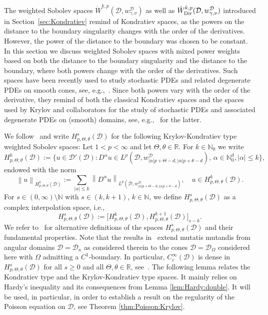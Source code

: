 \documentclass[12pt,a4paper, reqno]{amsart}
\theoremstyle{plain}
\theoremstyle{definition}
\theoremstyle{remark}
\numberwithin{equation}{section}
\newcommand{\1}{\mathbbm{1}}
\newcommand{\R}{\ensuremath{\mathbb{R}}}
\newcommand{\N}{\ensuremath{\mathbb{N}}}
\newcommand{\calD}{\ensuremath{\mathcal{D}}}
\newcommand{\scrD}{\ensuremath{\mathscr{D}}}
\newcommand{\Dir}{\textup{Dir}}
\newcommand{\nrm}[1]{\left\lVert #1 \right\rVert}
\begin{document}
The weighted Sobolev spaces $\Dot{W}^{k,p}(\calD,w_{\gamma,\nu}^\calD)$ as well as $\Dot{W}^{k,p}_\Dir(\calD,w_{\gamma,\nu}^\calD)$ introduced in Section~\ref{sec:Kondratiev} remind of Kondratiev spaces, as the powers on the distance to the boundary singularity changes with the order of the derivatives. 
However, the power of the distance to the boundary was chosen to be constant.
In this section we discuss weighted Sobolev spaces with mixed power weights based on both the distance to the boundary singularity and the distance to the boundary, where both powers change with the order of the derivatives. 
Such spaces have been recently used to study stochastic PDEs and related degenerate PDEs on smooth cones, see, e.g.,~\cite{cioicalicht2024sobolevspacesmixedweights,CioKimLee2019, KimLeeSeo2022b, KimLeeSeo2021,Cio20}.
Since both powers vary with the order of the derivative, they remind of both the classical Kondratiev spaces and the spaces used by Krylov and collaborators for the study of stochastic PDEs and associated degenerate PDEs on (smooth) domains, see, e.g.,~\cite{Krylov1999c,Lot2000,Kim2004} for the latter. 


We follow~\cite{cioicalicht2024sobolevspacesmixedweights} and write $H^s_{p,\Theta,\theta}(\calD)$ for the following Krylov-Kondratiev type weighted Sobolev spaces: 
Let $1<p<\infty$ and let $\Theta,\theta\in\R$. For $k\in\N_0$ we write
\[
H^k_{p,\Theta,\theta}(\calD)
:=
\big\{
u\in\scrD'(\calD)\colon D^\alpha u \in L^p(\calD,w^\calD_{\lvert\alpha\rvert p+\Theta-d,\lvert\alpha\rvert p+\theta-d}),\,\alpha \in\N_0^d,\lvert\alpha\rvert\leq k
\big\},
\]
endowed with the norm
\[
\nrm{u}_{H^k_{p,\Theta,\theta}(\calD)}
:=
\sum_{\lvert\alpha\rvert\leq k}
\nrm{D^\alpha u}_{L^p(\calD,w^\calD_{\lvert\alpha\rvert p+\Theta-d,\lvert\alpha\rvert p+\theta-d})},
\quad 
u\in H^k_{p,\Theta,\theta}(\calD).
\]
For $s\in (0,\infty)\setminus \N$ with $s\in (k,k+1)$, $k\in\N$, we define $H^s_{p,\Theta,\theta}(\calD)$ as a complex interpolation space, i.e., 
\[
H^s_{p,\Theta,\theta}(\calD)
:=
\big[H^k_{p,\Theta,\theta}(\calD),H^{k+1}_{p,\Theta,\theta}(\calD) \big]_{s-k}.
\]
We refer to~\cite[Section~3]{cioicalicht2024sobolevspacesmixedweights} for alternative definitions of the spaces $H^s_{p,\Theta,\theta}(\calD)$ and their fundamental properties. 
Note that the results in~\cite[Sections~3.1-3.7]{cioicalicht2024sobolevspacesmixedweights} extend mutatis mutandis from angular domains $\calD=\calD_\kappa$ as considered therein to the cones $\calD=\calD_\Omega$ considered here with $\Omega$ admitting a $C^1$-boundary. In particular, $C_c^\infty(\calD)$ is dense in $H^s_{p,\Theta,\theta}(\calD)$ for all $s\geq 0$ and all $\Theta,\theta\in\R$, see~\cite[Theorem~3.8]{cioicalicht2024sobolevspacesmixedweights}. The following lemma relates the Kondratiev type and the Krylov-Kondratiev type spaces. It mainly relies on Hardy's inequality and its consequences from Lemma \ref{lem:Hardy:double}. It will be used, in particular, in order to establish a result on the regularity of the Poisson equation on $\calD$, see Theorem \ref{thm:Poisson:Krylov}.
\end{document}
